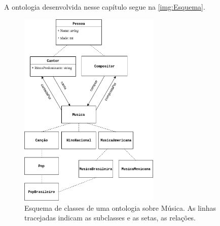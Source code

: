 A ontologia desenvolvida nesse capítulo segue na \autoref{img:Esquema}.

\begin{figure}
	\centering
	\includegraphics[width=0.6\textwidth]{Capitulos/Ontologias/OntologiaMusica}
	\caption{Esquema de classes de uma ontologia sobre Música. As linhas tracejadas indicam as subclasses e as setas, as relações.}
	\label{img:Esquema}
\end{figure}